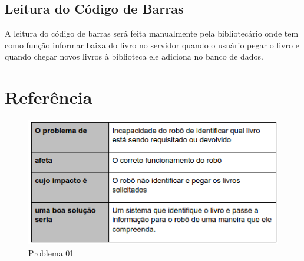 \subsection{Leitura do Código de Barras}
A leitura do código de barras será feita manualmente pela bibliotecário onde tem como função informar baixa do livro no servidor quando o usuário pegar o livro e quando chegar novos livros à biblioteca ele adiciona no banco de dados. 


\section{Referência}


\begin{figure}[!h]
\centering
\includegraphics[scale=0.65, angle = 360]{figuras/descricao_problema1}
\caption[]{Problema 01 \footnotemark}
\end{figure}
\FloatBarrier



